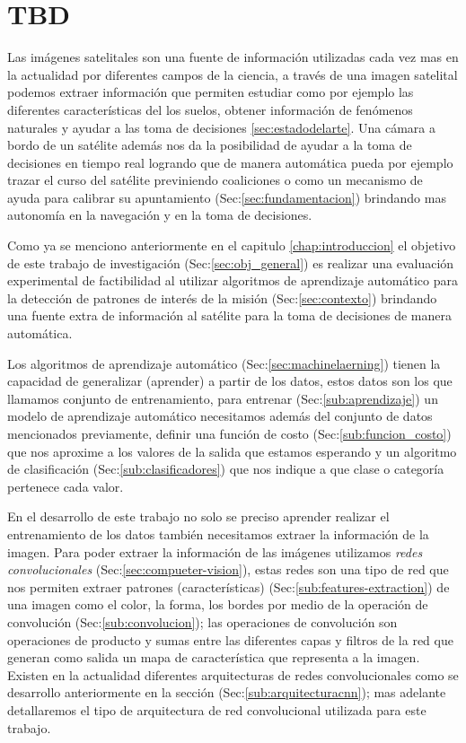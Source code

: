 \chapter{TBD}\label{chap:tbd}

Las imágenes satelitales son una fuente de información utilizadas cada vez mas en la actualidad por diferentes campos de la ciencia, a través de una imagen satelital podemos extraer información que permiten estudiar como por ejemplo las diferentes características del los suelos, obtener información de fenómenos naturales y ayudar a las toma de decisiones \ref{sec:estadodelarte}. Una cámara a bordo de un satélite además nos da la posibilidad de ayudar a la toma de decisiones en tiempo real logrando que de manera automática pueda por ejemplo trazar el curso del satélite previniendo coaliciones o como un mecanismo de ayuda para calibrar su apuntamiento (Sec:\ref{sec:fundamentacion}) brindando mas autonomía en la navegación y en la toma de decisiones. 

Como ya se menciono anteriormente en el  capitulo \ref{chap:introduccion} el objetivo de este trabajo de investigación  (Sec:\ref{sec:obj_general}) es realizar una evaluación experimental de factibilidad al utilizar algoritmos de aprendizaje automático para  la detección de patrones de interés de la misión  (Sec:\ref{sec:contexto})  brindando una  fuente extra de información al satélite para la toma de decisiones de manera automática. 

Los algoritmos de aprendizaje automático (Sec:\ref{sec:machinelaerning}) tienen la capacidad de generalizar (aprender)  a partir de los datos, estos datos son los que llamamos conjunto de entrenamiento, para entrenar (Sec:\ref{sub:aprendizaje}) un modelo de aprendizaje automático necesitamos además del conjunto de datos mencionados previamente, definir una función de costo (Sec:\ref{sub:funcion_costo}) que nos aproxime a los valores de la salida que estamos esperando y un algoritmo de clasificación (Sec:\ref{sub:clasificadores}) que nos indique a que clase o categoría pertenece cada valor. 

En el desarrollo de este trabajo no solo se preciso aprender realizar el entrenamiento de los datos también necesitamos extraer la información de la imagen. Para poder extraer la información de las imágenes utilizamos \textit{redes convolucionales} (Sec:\ref{sec:compueter-vision}), estas redes son una tipo de red que nos permiten extraer patrones (características) (Sec:\ref{sub:features-extraction}) de una imagen como el color, la forma, los bordes por medio de la operación de convolución (Sec:\ref{sub:convolucion}); las operaciones de convolución son operaciones de producto y sumas entre las diferentes capas y filtros de la red que generan como salida un mapa de característica que representa a la imagen. Existen en la actualidad diferentes arquitecturas de redes convolucionales como se desarrollo anteriormente en la sección (Sec:\ref{sub:arquitecturacnn}); mas adelante  detallaremos el tipo de arquitectura de red convolucional utilizada para este trabajo.

